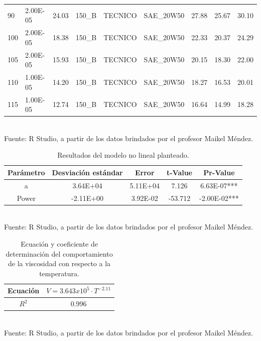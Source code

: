 \documentclass[12pt, letterpaper]{article}
\begin{document}
\begin{table}[ht]
\begin{tabular}{p{1.8cm}|p{1.5cm}p{1.5cm}p{1.5cm}p{1.5cm}p{2cm}p{1.2cm}p{1.2cm}p{1.2cm}}
  90 & 2.00E-05 & 24.03 & 150\_B & TECNICO & SAE\_20W50 & 27.88 & 25.67 & 30.10 \\ 
  100 & 2.00E-05 & 18.38 & 150\_B & TECNICO & SAE\_20W50 & 22.33 & 20.37 & 24.29 \\ 
  105 & 2.00E-05 & 15.93 & 150\_B & TECNICO & SAE\_20W50 & 20.15 & 18.30 & 22.00 \\ 
  110 & 1.00E-05 & 14.20 & 150\_B & TECNICO & SAE\_20W50 & 18.27 & 16.53 & 20.01 \\ 
  115 & 1.00E-05 & 12.74 & 150\_B & TECNICO & SAE\_20W50 & 16.64 & 14.99 & 18.28 \\ 
   \hline
\end{tabular}\\
Fuente: R Studio, a partir de los datos brindados por el profesor Maikel Méndez.
\end{table}

\begin{table}[ht]
\centering
\caption{Resultados del modelo no lineal planteado.}
\begin{tabular}{ccccc}
  \hline
Parámetro & Desviación estándar & Error & t-Value  & Pr-Value \\ 
  \hline
  a & 3.64E+04 & 5.11E+04 & 7.126 & 6.63E-07*** \\ 
  Power & -2.11E+00 & 3.92E-02 & -53.712 & -2.00E-02*** \\ 
  \hline
\end{tabular}\\
Fuente: R Studio, a partir de los datos brindados por el profesor Maikel Méndez.
\end{table}

\begin{table}[ht]
\centering
\caption{Ecuación y coeficiente de determinación del comportamiento de la viscosidad con respecto a la temperatura.}
\begin{tabular}{cc}
  \hline
Ecuación & $V=3.643x10^{5}\cdot T^{-2.11}$ \\ 
  \hline
  $R^{2}$ & 0.996 \\ 
   \hline
\end{tabular}\\
Fuente: R Studio, a partir de los datos brindados por el profesor Maikel Méndez.
\end{table}
\end{document}
